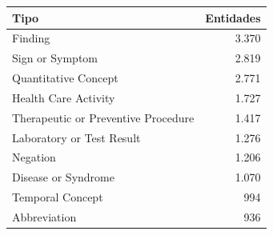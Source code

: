 \begin{tabular}{lr}
\toprule
Tipo & Entidades \\
\midrule
Finding & 3.370 \\
Sign or Symptom & 2.819 \\
Quantitative Concept & 2.771 \\
Health Care Activity & 1.727 \\
Therapeutic or Preventive Procedure & 1.417 \\
Laboratory or Test Result & 1.276 \\
Negation & 1.206 \\
Disease or Syndrome & 1.070 \\
Temporal Concept & 994 \\
Abbreviation & 936 \\
\bottomrule
\end{tabular}
